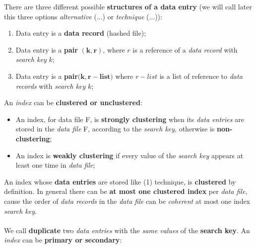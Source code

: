 \documentclass{article}
\begin{document}
There are three different possible \textbf{structures of a data entry} (we will call later this three options \emph{alternative} (...) or \emph{technique} (...)):
\begin{enumerate}
\item Data entry is a \textbf{data record} (hashed file);
\item Data entry is a \textbf{pair} $\mathbf{(k,r)}$, where $r$ is a reference of a \emph{data record} with \emph{search key} $k$;
\item Data entry is a \textbf{pair}$(\mathbf{k, r-list)}$ where $r-list$ is a list of reference to \emph{data records} with \emph{search key} $k$;
\end{enumerate}
An \emph{index} can be \textbf{clustered or unclustered}:
\begin{itemize}
\item An index, for data file F, is \textbf{strongly clustering} when its \emph{data entries} are stored in the \emph{data file} F, according to the \emph{search key}, otherwise is \textbf{non-clustering};
\item An index is \textbf{weakly clustering} if every value of the \emph{search key} appears at least one time in \emph{data file};
\end{itemize}
An index whose \textbf{data entries} are stored like (1) technique, is \textbf{clustered} by definition. In general there can be \textbf{at most one clustered index} per \emph{data file}, cause the order of \emph{data records} in the \emph{data file} can be \emph{coherent} at most one index \emph{search key}. \\\\
We call \textbf{duplicate} two \emph{data entries} with the \emph{same values} of the \textbf{search key}. An \emph{index} can be \textbf{primary or secondary}:
\end{document}
